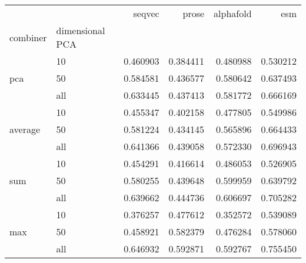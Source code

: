 \begin{tabular}{llrrrr}
\toprule
 &  & seqvec & prose & alphafold & esm \\
combiner & dimensional PCA &  &  &  &  \\
\midrule
\multirow[t]{3}{*}{pca} & 10 & 0.460903 & 0.384411 & 0.480988 & 0.530212 \\
 & 50 & 0.584581 & 0.436577 & 0.580642 & 0.637493 \\
 & all & 0.633445 & 0.437413 & 0.581772 & 0.666169 \\
\cline{1-6}
\multirow[t]{3}{*}{average} & 10 & 0.455347 & 0.402158 & 0.477805 & 0.549986 \\
 & 50 & 0.581224 & 0.434145 & 0.565896 & 0.664433 \\
 & all & 0.641366 & 0.439058 & 0.572330 & 0.696943 \\
\cline{1-6}
\multirow[t]{3}{*}{sum} & 10 & 0.454291 & 0.416614 & 0.486053 & 0.526905 \\
 & 50 & 0.580255 & 0.439648 & 0.599959 & 0.639792 \\
 & all & 0.639662 & 0.444736 & 0.606697 & 0.705282 \\
\cline{1-6}
\multirow[t]{3}{*}{max} & 10 & 0.376257 & 0.477612 & 0.352572 & 0.539089 \\
 & 50 & 0.458921 & 0.582379 & 0.476284 & 0.578060 \\
 & all & 0.646932 & 0.592871 & 0.592767 & 0.755450 \\
\cline{1-6}
\bottomrule
\end{tabular}
